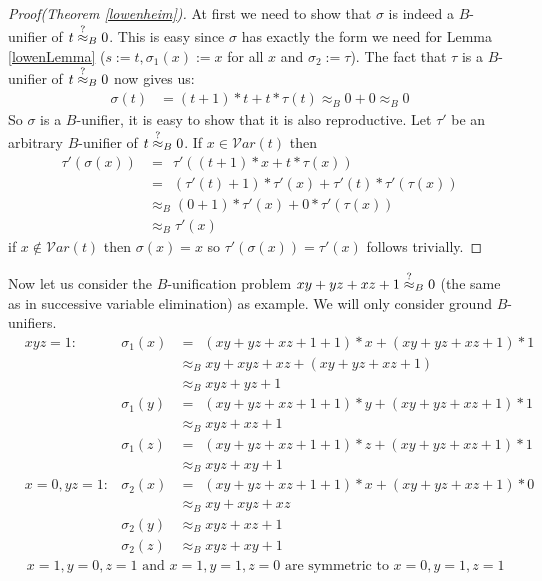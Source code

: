 		\begin{proof}[Proof(Theorem \ref{lowenheim})]
		At first we need to show that $\sigma$ is indeed a $B$-unifier of $t\stackrel{?}{\approx}_B0$. This is easy since $\sigma$ has exactly the form we need for Lemma \ref{lowenLemma} ($s:=t,\sigma_1(x):=x$ for all $x$ and $\sigma_2:=\tau$). The fact that $\tau$ is a $B$-unifier of $t\stackrel{?}{\approx}_B0$ now gives us:
		\begin{align*}
		\sigma(t)&=(t+1)*t+t*\tau(t)
		\approx_B0+0
		\approx_B0
		\end{align*}
		So $\sigma$ is a $B$-unifier, it is easy to show that it is also reproductive. Let $\tau'$ be an arbitrary $B$-unifier of $t\stackrel{?}{\approx}_B0$. If $x\in\mathcal{V}ar(t)$ then
		\begin{align*}
		\tau'(\sigma(x))&=\ \ \tau'((t+1)*x+t*\tau(x))\\
		&=\ \ (\tau'(t)+1)*\tau'(x)+\tau'(t)*\tau'(\tau(x))\\
		&\approx_B(0+1)*\tau'(x)+0*\tau'(\tau(x))\\
		&\approx_B\tau'(x)
		\end{align*}
		if $x\notin\mathcal{V}ar(t)$ then $\sigma(x)=x$ so $\tau'(\sigma(x))=\tau'(x)$ follows trivially.
		\end{proof}
		Now let us consider the $B$-unification problem $xy+yz+xz+1\stackrel{?}{\approx}_B0$ (the same as in successive variable elimination) as example. We will only consider ground $B$-unifiers.
		\begin{align*}
		& xyz=1:& \sigma_1(x)&=\ \ (xy+yz+xz+1+1)*x+(xy+yz+xz+1)*1\\
		&&&\approx_Bxy+xyz+xz+(xy+yz+xz+1)\\
		&&&\approx_Bxyz+yz+1\\
		&&\sigma_1(y)&=\ \ (xy+yz+xz+1+1)*y+(xy+yz+xz+1)*1\\
		&&&\approx_Bxyz+xz+1\\
		&&\sigma_1(z)&=\ \ (xy+yz+xz+1+1)*z+(xy+yz+xz+1)*1\\
		&&&\approx_Bxyz+xy+1\\
		& x=0,yz=1:& \sigma_2(x)&=\ \ (xy+yz+xz+1+1)*x+(xy+yz+xz+1)*0\\
		&&&\approx_Bxy+xyz+xz\\
		&&\sigma_2(y)&\approx_Bxyz+xz+1\\
		&&\sigma_2(z)&\approx_Bxyz+xy+1
		\end{align*}
		\begin{align*}
		& x=1,y=0,z=1\text{ and }x=1,y=1,z=0\text{ are symmetric to }x=0,y=1,z=1
		\end{align*} 
